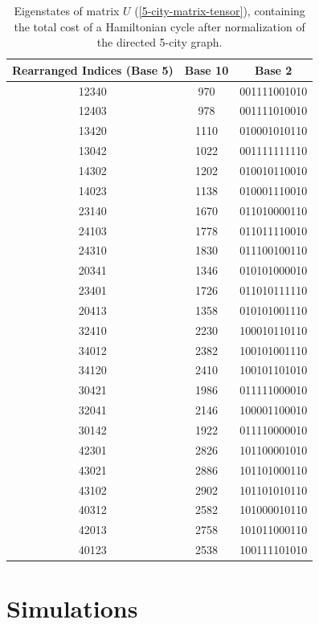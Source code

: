 \documentclass[msc,oneside]{ubcthesis}
\begin{document}
\begin{table}[h]
\centering
\begin{tabular}{|c|c|c|}	
		
		\hline
		\textbf{Rearranged Indices (Base 5)} & \textbf{Base 10} & \textbf{Base 2} \\
		\hline
		12340 & 970 & 001111001010 \\
		12403 & 978 & 001111010010 \\
		13420 & 1110 & 010001010110 \\
		13042 & 1022 & 001111111110 \\
		14302 & 1202 & 010010110010 \\
		14023 & 1138 & 010001110010 \\
		23140 & 1670 & 011010000110 \\
		24103 & 1778 & 011011110010 \\
		24310 & 1830 & 011100100110 \\
		20341 & 1346 & 010101000010 \\
		23401 & 1726 & 011010111110 \\
		20413 & 1358 & 010101001110 \\
		32410 & 2230 & 100010110110 \\
		34012 & 2382 & 100101001110 \\
		34120 & 2410 & 100101101010 \\
		30421 & 1986 & 011111000010 \\
		32041 & 2146 & 100001100010 \\
		30142 & 1922 & 011110000010 \\
		42301 & 2826 & 101100001010 \\
		43021 & 2886 & 101101000110 \\
		43102 & 2902 & 101101010110 \\
		40312 & 2582 & 101000010110 \\
		42013 & 2758 & 101011000110 \\
		40123 & 2538 & 100111101010 \\
		\hline
		\end{tabular}
		\caption{Eigenstates of matrix $U$ (\ref{5-city-matrix-tensor}), containing the total cost of a Hamiltonian cycle after normalization of the directed 5-city graph.}
		\label{table:5-city-conversions}
	\end{table}
	
	


	
	\chapter{Simulations}
	
\end{document}
